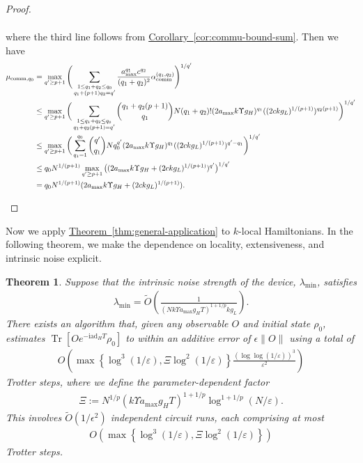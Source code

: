 \documentclass[aps,pra,reprint,groupedaddress,floatfix]{revtex4-2}
\newtheorem{theorem}{Theorem}
\newcommand{\thm}[1]{\hyperref[thm:#1]{Theorem~\ref*{thm:#1}}}
\newcommand{\cor}[1]{\hyperref[cor:#1]{Corollary~\ref*{cor:#1}}}
\renewcommand{\i}{\mathrm{i}}
\newcommand{\ad}{\mathrm{ad}}
\newcommand{\eps}{\varepsilon}
\begin{document}
\begin{proof}
\begin{widetext}
\begin{align*}
    \end{align*}
    where the third line follows from \cor{commu-bound-sum}. Then we have  \begin{align*}
        \mu_{\mathrm{comm},q_0} &= \max_{q' \ge p+1} \Bigg(\sum_{\substack{1\le q_1+q_2\le q_0 \\
        q_1+(p+1)q_2 = q'}}\frac{a_{\max}^{q_1}c^{q_2}}{(q_1+q_2)^2} \alpha_{\rm comm}^{(q_1, q_2)}\Bigg)^{1/q'} \\
        &\le \max_{q' \ge p+1} \bigg(\sum_{\substack{1\le q_1+q_2\le q_0 \\
        q_1+q_2(p+1) = q'}}\binom{q_1+q_2(p+1)}{q_1}N(q_1+q_2)!(2a_{\max}k\Upsilon g_H)^{q_1}((2ckg_L)^{1/(p+1)})^{q_2(p+1)}\bigg)^{1/q'}\\
        &\le \max_{q' \ge p+1} \bigg(\sum_{q_1=1}^{q_0}\binom{q'}{q_1}Nq_0^{q'}(2a_{\max}k\Upsilon g_H)^{q_1}((2ckg_L)^{1/(p+1)})^{q'-q_1}\bigg)^{1/q'}\\
    &\le q_0N^{1/(p+1)}\max_{q'\ge p+1} \big((2a_{\max}k\Upsilon g_H+(2ckg_L)^{1/(p+1)})^{q'}\big)^{1/q'}\\
    &=q_0N^{1/(p+1)}(2a_{\max}k\Upsilon g_H+(2ckg_L)^{1/(p+1)}).
    \end{align*}
    \end{widetext}
\end{proof}

Now we apply \thm{general-application} to $k$-local Hamiltonians. In the following theorem, we make the dependence on locality, extensiveness, and intrinsic noise explicit.  
\begin{theorem}
\label{thm:extrapolation-k-local}
    Suppose that the intrinsic noise strength of the device, $\lambda_{\min}$, satisfies
    \begin{align}
    \label{eq:cond-lambda}
        \lambda_{\min} = \widetilde{O}\left(\frac{1}{(Nk\Upsilon a_{\max}g_HT)^{1+1/p} kg_L}\right).
    \end{align} 
    There exists an algorithm that, given any observable $O$ and initial state $\rho_0$, estimates $\operatorname{Tr}[O e^{-\i \ad_H T}\rho_0]$ to within an additive error of $\epsilon\|O\|$ using a total of 
    \begin{align*}
        O\left( \max\left\{\log^3(1/\eps), \Xi \log^2(1/\eps)\right\} \frac{(\log\log (1/\eps))^3}{\eps^2} \right)
    \end{align*}
    Trotter steps, where we define the parameter-dependent factor
    \begin{align*}
        \Xi := N^{1/p}(k\Upsilon a_{\max} g_H T)^{1+1/p} \log^{1+1/p}(N/\eps).
    \end{align*}
    This involves $\widetilde{O}(1/\epsilon^2)$ independent circuit runs, each comprising at most
    \begin{align*}
        O\left( \max\left\{\log^3(1/\eps), \Xi \log^2(1/\eps)\right\} \right)
    \end{align*}
    Trotter steps.
\end{theorem}
\end{document}
